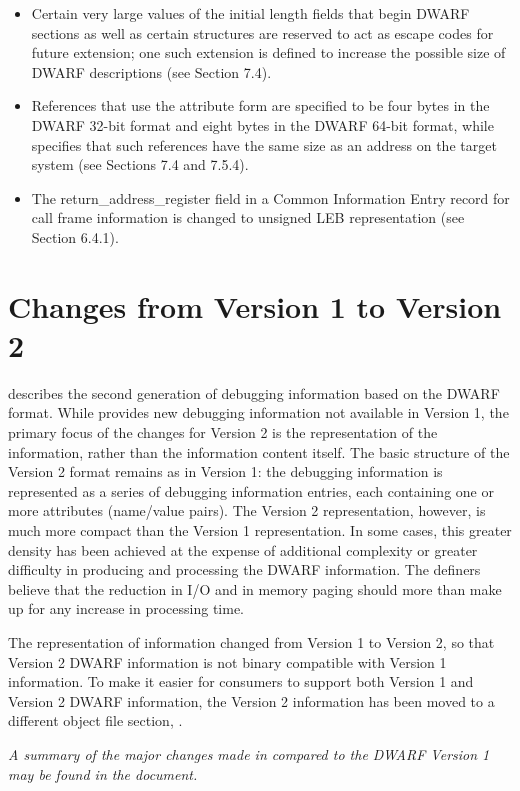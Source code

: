 \begin{itemize}
\item
Certain very large values of the initial length fields that
begin DWARF sections as well as certain structures are reserved
to act as escape codes for future extension; one such extension
is defined to increase the possible size of DWARF descriptions
(see Section 7.4).

\item
References that use the attribute form 
are specified to be four bytes in the DWARF 32-bit format and
eight bytes in the DWARF 64-bit format, while 
specifies that such references have the same size as an
address on the target system (see Sections 7.4 and 7.5.4).

\item
The return\_address\_register field in a Common Information
Entry record for call frame information is changed to unsigned
LEB representation (see Section 6.4.1).

\end{itemize}


\section{Changes from Version 1 to Version 2}
describes the second generation of debugging
information based on the DWARF format. While 
provides new debugging information not available in
Version 1, the primary focus of the changes for Version
2 is the representation of the information, rather than
the information content itself. The basic structure of
the Version 2 format remains as in Version 1: the debugging
information is represented as a series of debugging information
entries, each containing one or more attributes (name/value
pairs). The Version 2 representation, however, is much more
compact than the Version 1 representation. In some cases,
this greater density has been achieved at the expense of
additional complexity or greater difficulty in producing and
processing the DWARF information. The definers believe that the
reduction in I/O and in memory paging should more than make
up for any increase in processing time.  

The representation
of information changed from Version 1 to Version 2, so that
Version 2 DWARF information is not binary compatible with
Version 1 information. To make it easier for consumers to
support both Version 1 and Version 2 DWARF information, the
Version 2 information has been moved to a different object
file section, .  

\textit{
A summary of the major changes made in 
compared to the DWARF Version 1 may be found in the 
document.
}

